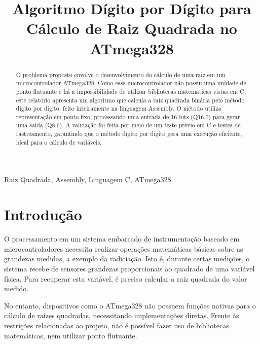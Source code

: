\documentclass[conference]{IEEEtran}
\begin{document}
\title{Algoritmo Dígito por Dígito para Cálculo de Raiz Quadrada no ATmega328}
\author{
}

\maketitle

\begin{abstract}
O problema proposto envolve o desenvolvimento do cálculo de uma raiz em um microcontrolador ATmega328. Como esse microcontrolador não possui uma unidade de ponto flutuante e há a impossibilidade de utilizar bibliotecas matemáticas vistas em C, este relatório apresenta um algoritmo que calcula a raiz quadrada binária pelo método dígito por dígito, feito inteiramente na linguagem Assembly. O método utiliza representação em ponto fixo, processando uma entrada de 16 bits (Q16.0) para gerar uma saída (Q8.6). A validação foi feita por meio de um teste prévio em C e testes de rastreamento, garantindo que o método dígito por dígito gera uma execução eficiente, ideal para o cálculo de variáveis.
\end{abstract}

\begin{IEEEkeywords}
Raiz Quadrada, Assembly, Linguagem C, ATmega328.
\end{IEEEkeywords}

\section{Introdução}
O processamento em um sistema embarcado de instrumentação baseado em microcontroladores necessita realizar operações matemáticas básicas sobre as grandezas medidas, a exemplo da radiciação. Isto é, durante certas medições, o sistema recebe de sensores grandezas proporcionais ao quadrado de uma variável física. Para recuperar esta variável, é preciso calcular a raiz quadrada do valor medido.

No entanto, dispositivos como o ATmega328 não possuem funções nativas para o cálculo de raízes quadradas, necessitando implementações diretas. Frente às restrições relacionadas ao projeto, não é possível fazer uso de bibliotecas matemáticas, nem utilizar ponto flutuante.
\end{document}
